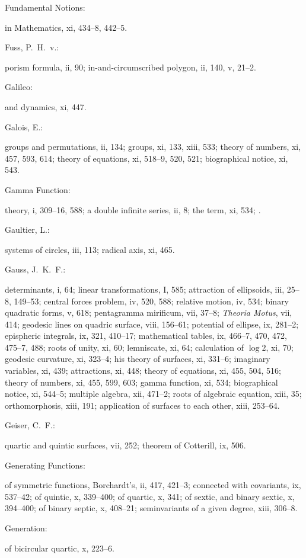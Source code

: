 \documentclass[11pt,a4paper]{book}
\providecommand{\V}[1]{#1}
\providecommand{\IndexEntry}[2]{#1\dotfill #2\par}
\begin{document}
\IndexEntry{Fundamental Notions}: in Mathematics, \V{xi}, 434--8, 442--5.

\IndexEntry{Fuss, P.\ H.\ v.}: porism formula, \V{ii}, 90; in-and-circumscribed polygon, \V{ii}, 140, \V{v}, 21--2.

\IndexEntry{Galileo}: and dynamics, \V{xi}, 447.

\IndexEntry{Galois, E.}: groups and permutations, \V{ii}, 134; groups, \V{xi}, 133, \V{xiii}, 533; theory of numbers, \V{xi}, 457, 593, 614; theory of equations, \V{xi}, 518--9, 520, 521; biographical notice, \V{xi}, 543.

\IndexEntry{Gamma Function}: theory, \V{i}, 309--16, 588; a double infinite series, \V{ii}, 8; the term, \V{xi}, 534; .

\IndexEntry{Gaultier, L.}: systems of circles, \V{iii}, 113; radical axis, \V{xi}, 465.

\IndexEntry{Gauss, J.\ K.\ F.}: determinants, \V{i}, 64; linear transformations, \V{I}, 585; attraction of ellipsoids, \V{iii}, 25--8, 149--53; central forces problem, \V{iv}, 520, 588; relative motion, \V{iv}, 534; binary quadratic forms, \V{v}, 618; pentagramma mirificum, \V{vii}, 37--8; \textit{Theoria Motus}, \V{vii}, 414; geodesic lines on quadric surface, \V{viii}, 156--61; potential of ellipse, \V{ix}, 281--2; epispheric integrals, \V{ix}, 321, 410--17; mathematical tables, \V{ix}, 466--7, 470, 472, 475--7, 488; roots of unity, \V{xi}, 60; lemniscate, \V{xi}, 64; calculation of $\log 2$, \V{xi}, 70; geodesic curvature, \V{xi}, 323--4; his theory of surfaces, \V{xi}, 331--6; imaginary variables, \V{xi}, 439; attractions, \V{xi}, 448; theory of equations, \V{xi}, 455, 504, 516; theory of numbers, \V{xi}, 455, 599, 603; gamma function, \V{xi}, 534; biographical notice, \V{xi}, 544--5; multiple algebra, \V{xii}, 471--2; roots of algebraic equation, \V{xiii}, 35; orthomorphosis, \V{xiii}, 191; application of surfaces to each other, \V{xiii}, 253--64.

\IndexEntry{Geiser, C.\ F.}: quartic and quintic surfaces, \V{vii}, 252; theorem of Cotterill, \V{ix}, 506.

\IndexEntry{Generating Functions}: of symmetric functions, Borchardt's, \V{ii}, 417, 421--3; connected with covariants, \V{ix}, 537--42; of quintic, \V{x}, 339--400; of quartic, \V{x}, 341; of sextic, and binary sextic, \V{x}, 394--400; of binary septic, \V{x}, 408--21; seminvariants of a given degree, \V{xiii}, 306--8.

\IndexEntry{Generation}: of bicircular quartic, \V{x}, 223--6.
\end{document}
